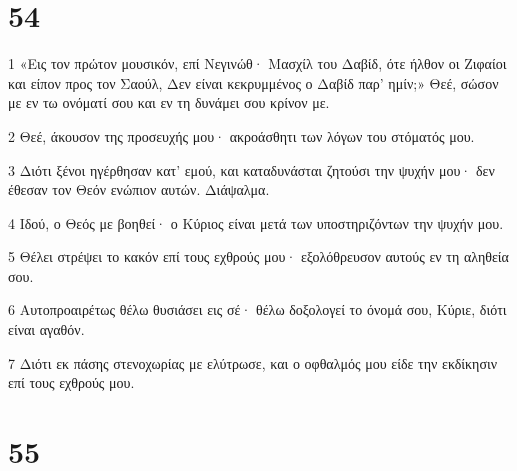 \chapter{54}

\par 1 «Εις τον πρώτον μουσικόν, επί Νεγινώθ· Μασχίλ του Δαβίδ, ότε ήλθον οι Ζιφαίοι και είπον προς τον Σαούλ, Δεν είναι κεκρυμμένος ο Δαβίδ παρ' ημίν;» Θεέ, σώσον με εν τω ονόματί σου και εν τη δυνάμει σου κρίνον με.
\par 2 Θεέ, άκουσον της προσευχής μου· ακροάσθητι των λόγων του στόματός μου.
\par 3 Διότι ξένοι ηγέρθησαν κατ' εμού, και καταδυνάσται ζητούσι την ψυχήν μου· δεν έθεσαν τον Θεόν ενώπιον αυτών. Διάψαλμα.
\par 4 Ιδού, ο Θεός με βοηθεί· ο Κύριος είναι μετά των υποστηριζόντων την ψυχήν μου.
\par 5 Θέλει στρέψει το κακόν επί τους εχθρούς μου· εξολόθρευσον αυτούς εν τη αληθεία σου.
\par 6 Αυτοπροαιρέτως θέλω θυσιάσει εις σέ· θέλω δοξολογεί το όνομά σου, Κύριε, διότι είναι αγαθόν.
\par 7 Διότι εκ πάσης στενοχωρίας με ελύτρωσε, και ο οφθαλμός μου είδε την εκδίκησιν επί τους εχθρούς μου.

\chapter{55}

